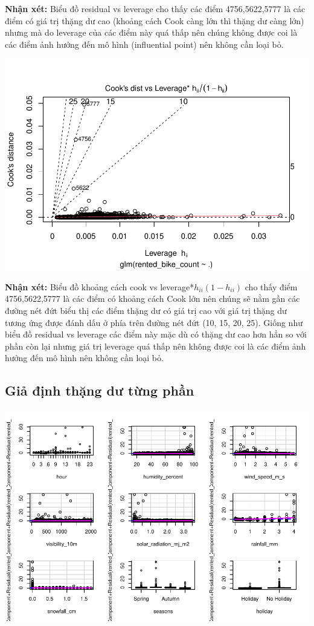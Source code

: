 \documentclass[
  11pt,
  letterpaper,
]{article}
\begin{document}
\textbf{Nhận xét:} Biểu đồ residual vs leverage cho thấy các điểm 4756,5622,5777 là các điểm có giá trị thặng dư cao (khoảng cách Cook càng lớn thì thặng dư càng lớn) nhưng mà do leverage của các điểm này quá thấp nên chúng không được coi là các điểm ảnh hưởng đến mô hình (influential point) nên không cần loại bỏ.

\begin{center}\includegraphics[width=1.2\linewidth,]{Final_Project_files/figure-latex/unnamed-chunk-38-1} \end{center}

\textbf{Nhận xét:} Biểu đồ khoảng cách cook vs leverage*\(h_{ii}(1 - h_{ii})\) cho thấy điểm 4756,5622,5777 là các điểm có khoảng cách Cook lớn nên chúng sẽ nằm gần các đường nét đứt biểu thị các điểm thặng dư có giá trị cao với giá trị thặng dư tương ứng được đánh dấu ở phía trên đường nét đứt (10, 15, 20, 25). Giống như biểu đồ residual vs leverage các điểm này mặc dù có thặng dư cao hơn hẳn so với phần còn lại nhưng giá trị leverage quá thấp nên không được coi là các điểm ảnh hưởng đến mô hình nên không cần loại bỏ.

\subsection{Giả định thặng dư từng phần}

\begin{center}\includegraphics[width=1.2\linewidth,]{Final_Project_files/figure-latex/unnamed-chunk-39-1} \end{center}
\end{document}
